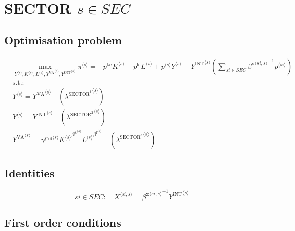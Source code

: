 \section{SECTOR $s\in {S\!E\!C}$}

\subsection{Optimisation problem}

\begin{align}
&\max_{{Y}^{\langle s\rangle}, {K}^{\langle s\rangle}, {L}^{\langle s\rangle}, {Y^{\mathrm{VA}}}^{\langle s\rangle}, {Y^{\mathrm{INT}}}^{\langle s\rangle}
} {\pi}^{\langle s\rangle} = -{p^{\mathrm{kc}}} {{K}^{\langle s\rangle}} - {p^{\mathrm{lc}}} {{L}^{\langle s\rangle}} + {{p}^{\langle s\rangle}} {{Y}^{\langle s\rangle}} - {{Y^{\mathrm{INT}}}^{\langle s\rangle}} \left(\sum_{{s\!i}\in {S\!E\!C}} {{\beta^{\mathrm{x}}}^{\langle {s\!i},s\rangle}}^{-1} {{p}^{\langle {s\!i}\rangle}}\right)\\
&\mathrm{s.t.:}\nonumber\\
& {Y}^{\langle s\rangle} = {Y^{\mathrm{VA}}}^{\langle s\rangle} \quad \left({\lambda^{\mathrm{SECTOR}^{\mathrm{1}}}}^{\langle s\rangle}\right)\\
& {Y}^{\langle s\rangle} = {Y^{\mathrm{INT}}}^{\langle s\rangle} \quad \left({\lambda^{\mathrm{SECTOR}^{\mathrm{2}}}}^{\langle s\rangle}\right)\\
& {Y^{\mathrm{VA}}}^{\langle s\rangle} = {{\gamma^{\mathrm{yva}}}^{\langle s\rangle}} {{{K}^{\langle s\rangle}}^{{\beta^{\mathrm{k}}}^{\langle s\rangle}}} {{{L}^{\langle s\rangle}}^{{\beta^{\mathrm{l}}}^{\langle s\rangle}}} \quad \left({\lambda^{\mathrm{SECTOR}^{\mathrm{3}}}}^{\langle s\rangle}\right)
\end{align}


\subsection{Identities}

\begin{equation}
{s\!i}\in {S\!E\!C}\colon\quad {X}^{\langle {s\!i},s\rangle} = {{\beta^{\mathrm{x}}}^{\langle {s\!i},s\rangle}}^{-1} {{Y^{\mathrm{INT}}}^{\langle s\rangle}}
\end{equation}


\subsection{First order conditions}

